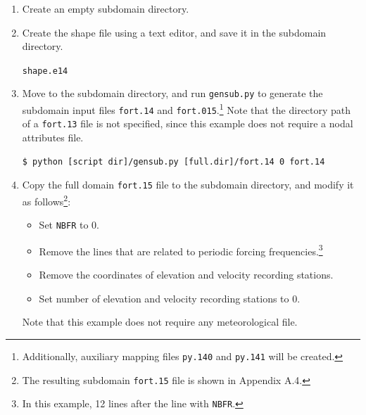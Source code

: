 \documentclass[11pt,titlepage]{article}
\begin{document}
\begin{enumerate}
\item Create an empty subdomain directory.
\item Create the shape file using a text editor, and save it in the
  subdomain directory.

\vspace{5pt}
\noindent
\mbox{}\hspace{30pt}\verb+shape.e14+\\[3pt]
\mbox{}\hspace{30pt}
\vspace{11pt}

\item Move to the subdomain directory, and run \verb+gensub.py+ to
  generate the subdomain input files \verb+fort.14+ and
  \verb+fort.015+.\footnote{Additionally, auxiliary mapping files
  \texttt{py.140} and \texttt{py.141} will be created.} Note that the 
  directory path of a
  \verb+fort.13+ file is not specified, since this example does not
  require a nodal attributes file.

\begin{verbatim}
$ python [script dir]/gensub.py [full.dir]/fort.14 0 fort.14

\end{verbatim}

\item Copy the full domain \verb+fort.15+ file to the subdomain
  directory, and modify it as follows\footnote{The resulting subdomain
  \texttt{fort.15} file is shown in Appendix A.4.}:

\begin{itemize}
\item Set \verb+NBFR+ to 0.
\item Remove the lines that are related to periodic forcing
  frequencies.\footnote{In this example, 12 lines after the line with
  \texttt{NBFR}.}
\item Remove the coordinates of elevation and velocity recording
  stations.
\item Set number of elevation and velocity recording stations to 0.
\end{itemize}
Note that this example does not require any meteorological file.


\end{enumerate}
\end{document}
